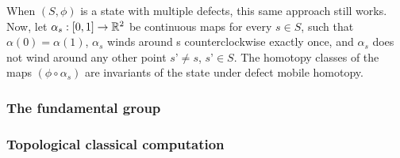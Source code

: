 \documentclass{article}
\theoremstyle{definition}
\numberwithin{figure}{section}
\begin{document}
When $(S,\phi)$ is a state with multiple defects, this same approach still works. Now, let $\alpha_s:[0,1]\to\mathbb{R}^2$ be continuous maps for every $s\in S$, such that $\alpha(0)=\alpha(1)$, $\alpha_s$ winds around s counterclockwise exactly once, and $\alpha_s$ does not wind around any other point $s’\neq s$, $s’\in S$. The homotopy classes of the maps $(\phi\circ \alpha_s)$ are invariants of the state under defect mobile homotopy.


\subsubsection{The fundamental group}



\subsubsection{Topological classical computation}











\end{document}
